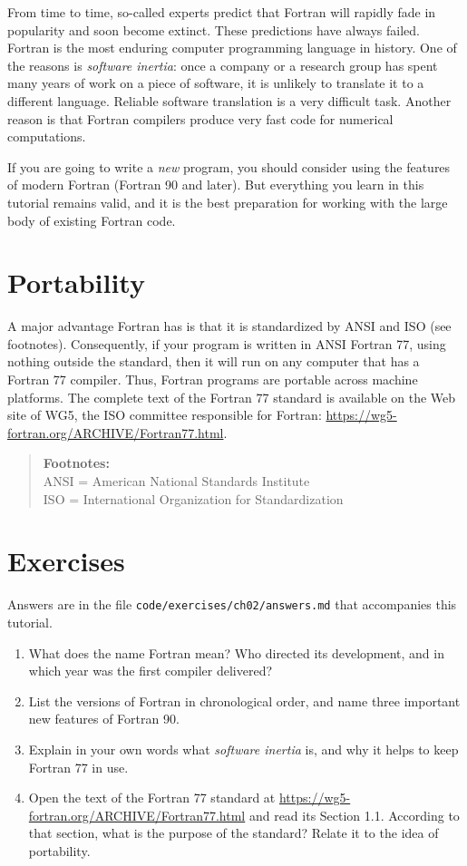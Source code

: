 From time to time, so-called experts predict that Fortran will rapidly fade in popularity and soon become extinct. These predictions have always failed. Fortran is the most enduring computer programming language in history. One of the reasons is \emph{software inertia}: once a company or a research group has spent many years of work on a piece of software, it is unlikely to translate it to a different language. Reliable software translation is a very difficult task. Another reason is that Fortran compilers produce very fast code for numerical computations.

If you are going to write a \emph{new} program, you should consider using the features of modern Fortran (Fortran 90 and later). But everything you learn in this tutorial remains valid, and it is the best preparation for working with the large body of existing Fortran code.

\section{Portability}

A major advantage Fortran has is that it is standardized by ANSI and ISO (see footnotes). Consequently, if your program is written in ANSI Fortran 77, using nothing outside the standard, then it will run on any computer that has a Fortran 77 compiler. Thus, Fortran programs are portable across machine platforms. The complete text of the Fortran 77 standard is available on the Web site of WG5, the ISO committee responsible for Fortran: \url{https://wg5-fortran.org/ARCHIVE/Fortran77.html}.

\begin{quote}
\textbf{Footnotes:}\\
ANSI = American National Standards Institute\\
ISO = International Organization for Standardization
\end{quote}

\section{Exercises}

Answers are in the file \texttt{code/exercises/ch02/answers.md} that accompanies this tutorial.

\begin{enumerate}
    \item What does the name Fortran mean? Who directed its development, and in which year was the first compiler delivered?
    \item List the versions of Fortran in chronological order, and name three important new features of Fortran 90.
    \item Explain in your own words what \emph{software inertia} is, and why it helps to keep Fortran 77 in use.
    \item Open the text of the Fortran 77 standard at \url{https://wg5-fortran.org/ARCHIVE/Fortran77.html} and read its Section 1.1. According to that section, what is the purpose of the standard? Relate it to the idea of portability.
\end{enumerate}
